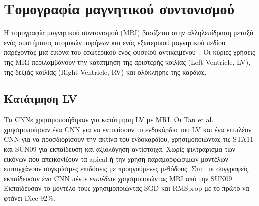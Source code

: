 \section{Τομογραφία μαγνητικού συντονισμού}
Η τομογραφία μαγνητικού συντονισμού (MRI) βασίζεται στην αλληλεπίδραση μεταξύ ενός συστήματος ατομικών πυρήνων και ενός εξωτερικού μαγνητικού πεδίου παρέχοντας μια εικόνα του εσωτερικού ενός φυσικού αντικειμένου~\cite{sebastiani1991mathematical}.
Οι κύριες χρήσεις της MRI περιλαμβάνουν την κατάτμηση της αριστερής κοιλίας (Left Ventricle, LV), της δεξιάς κοιλίας (Right Ventricle, RV) και ολόκληρης της καρδιάς.

\subsection{Κατάτμηση LV}
Τα CNNs χρησιμοποιήθηκαν για κατάτμηση LV με MRI\@.
Οι Tan et al.~\cite{tan2016cardiac} χρησιμοποίησαν ένα CNN για να εντοπίσουν το ενδοκάρδιο του LV και ένα επιπλέον CNN για να προσδιορίσουν την ακτίνα του ενδοκαρδίου, χρησιμοποιώντας τις STA11 και SUN09 για εκπαίδευση και αξιολόγηση αντίστοιχα.
Χωρίς φιλτράρισμα των εικόνων που απεικονίζουν τα apical ή την χρήση παραμορφώσιμων μοντέλων επιτυγχάνουν συγκρίσιμες επιδόσεις με προηγούμενες μεθόδους.
Στο~\cite{romaguera2017left} οι συγγραφείς εκπαίδευσαν ένα CNN πέντε \textit{επιπέδων} χρησιμοποιώντας MRI από την SUN09.
Εκπαίδευσαν το μοντέλο τους χρησιμοποιώντας SGD και RMSprop με το πρώτο να φτάνει Dice 92\%.

